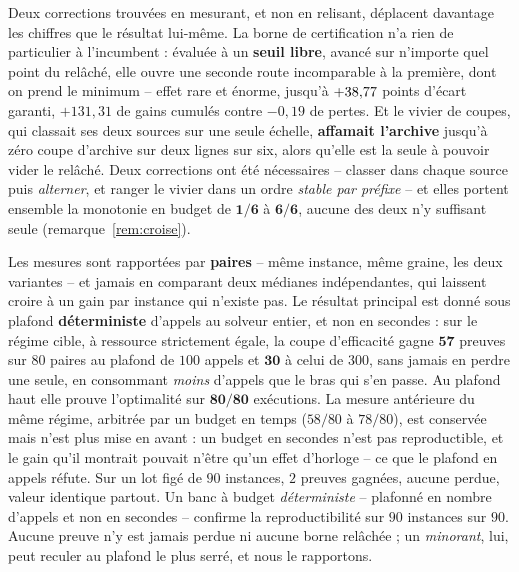 \documentclass[11pt,a4paper]{article}
\theoremstyle{plain}
\theoremstyle{remark}
\begin{document}
Deux corrections trouvées en mesurant, et non en relisant, déplacent
davantage les chiffres que le résultat lui-même. La borne de certification
n'a rien de particulier à l'incumbent : évaluée à un \textbf{seuil libre},
avancé sur n'importe quel point du relâché, elle ouvre une seconde route
incomparable à la première, dont on prend le minimum -- effet rare et
énorme, jusqu'à $+38{,}77{}$ points d'écart garanti, $+131{,}31$ de gains
cumulés contre $-0{,}19$ de pertes. Et le vivier de coupes, qui classait ses
deux sources sur une seule échelle, \textbf{affamait l'archive} jusqu'à zéro
coupe d'archive sur deux lignes sur six, alors qu'elle est la seule à
pouvoir vider le relâché. Deux corrections ont été nécessaires -- classer
dans chaque source puis \emph{alterner}, et ranger le vivier dans un ordre
\emph{stable par préfixe} -- et elles portent ensemble la monotonie en
budget de $\mathbf{1/6}$ à $\mathbf{6/6}$, aucune des deux n'y suffisant
seule (remarque~\ref{rem:croise}).

Les mesures sont rapportées par \textbf{paires} -- même instance, même
graine, les deux variantes -- et jamais en comparant deux médianes
indépendantes, qui laissent croire à un gain par instance qui n'existe pas.
Le résultat principal est donné sous plafond \textbf{déterministe} d'appels
au solveur entier, et non en secondes : sur le régime cible, à ressource
strictement égale, la coupe d'efficacité gagne $\mathbf{57}$ preuves sur
$80$ paires au plafond de $100$ appels et $\mathbf{30}$ à celui de $300$,
sans jamais en perdre une seule, en consommant \emph{moins} d'appels que le
bras qui s'en passe. Au plafond haut elle prouve l'optimalité sur
$\mathbf{80/80}$ exécutions. La mesure antérieure du même régime, arbitrée
par un budget en temps ($58/80$ à $78/80$), est conservée mais n'est plus
mise en avant : un budget en secondes n'est pas reproductible, et le gain
qu'il montrait pouvait n'être qu'un effet d'horloge -- ce que le plafond en
appels réfute. Sur un lot
figé de $90$ instances, $2$ preuves gagnées, aucune perdue, valeur identique
partout. Un banc à budget \emph{déterministe} -- plafonné en nombre d'appels
et non en secondes -- confirme la reproductibilité sur $90$ instances sur
$90$. Aucune preuve n'y est jamais perdue ni aucune borne relâchée ; un
\emph{minorant}, lui, peut reculer au plafond le plus serré, et nous le
rapportons.
\end{document}
